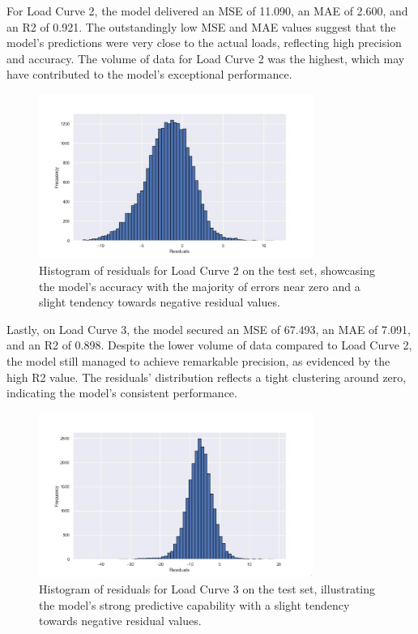 \documentclass{article} %
\begin{document}
For Load Curve 2, the model delivered an \gls*{MSE} of 11.090, an \gls*{MAE} of 2.600, and an \gls*{R2} of 0.921. The outstandingly low \gls*{MSE} and \gls*{MAE} values suggest that the model's predictions were very close to the actual loads, reflecting high precision and accuracy. The volume of data for Load Curve 2 was the highest, which may have contributed to the model's exceptional performance.
\begin{figure}[H]
\centering
\includegraphics[width=0.8\textwidth]{ressources/residuals/erg/lc2/residuals.jpg}
\caption{Histogram of residuals for Load Curve 2 on the test set, showcasing the model's accuracy with the majority of errors near zero and a slight tendency towards negative residual values.}
\label{fig:residuals_curve2}
\end{figure}

Lastly, on Load Curve 3, the model secured an \gls*{MSE} of 67.493, an \gls*{MAE} of 7.091, and an \gls*{R2} of 0.898. Despite the lower volume of data compared to Load Curve 2, the model still managed to achieve remarkable precision, as evidenced by the high \gls*{R2} value. The residuals' distribution reflects a tight clustering around zero, indicating the model's consistent performance.


\begin{figure}[H]
\centering
\includegraphics[width=0.8\textwidth]{ressources/residuals/erg/lc3/residuals.jpg}
\caption{Histogram of residuals for Load Curve 3 on the test set, illustrating the model's strong predictive capability with a slight tendency towards negative residual values.}
\label{fig:residuals_curve3}
\end{figure}
\end{document}
